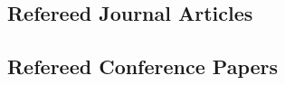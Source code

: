 
\subsection{Refereed Journal Articles}
\begin{refsection}
\nocite{*}
\printbibliography[heading=none,sorting=ynt]
\end{refsection}

\subsection{Refereed Conference Papers}
\begin{refsection}
\nocite{*}
\printbibliography[heading=none,sorting=ynt]
\end{refsection}





